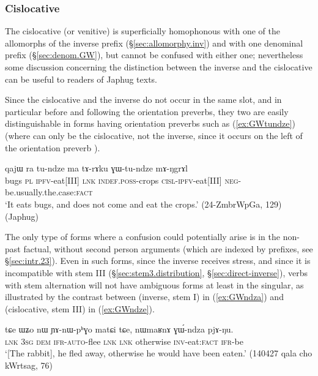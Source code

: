 \subsubsection{Cislocative} \label{sec:cislocative.morpho}
The cislocative (or venitive)  is superficially homophonous with one of the allomorphs of the inverse prefix  (§\ref{sec:allomorphy.inv}) and with one denominal prefix (§\ref{sec:denom.GW}), but cannot be confused with either one; nevertheless some discussion concerning the distinction between the inverse and the cislocative can be useful to readers of Japhug texts.

Since the cislocative and the inverse do not occur in the same slot, and in particular before and following the orientation preverbs, they two are easily distinguishable in forms having orientation preverbs such as (\ref{ex:GWtundze}) (where  can only be the cislocative, not the inverse, since it occurs on the left of the orientation preverb ).

\begin{exe}
\ex \label{ex:GWtundze}
 \gll qajɯ ra tu-ndze ma tɤ-rɤku ɣɯ-tu-ndze mɤ-ŋgrɤl \\
bugs \textsc{pl} \textsc{ipfv}-eat[III] \textsc{lnk} \textsc{indef}.\textsc{poss}-crops   \textsc{cisl}-\textsc{ipfv}-eat[III] \textsc{neg}-be.usually.the.case:\textsc{fact} \\
\glt `It eats bugs, and does not come and eat the crops.' (24-ZmbrWpGa, 129) (Japhug)
\end{exe}

The only type of forms where a confusion could potentially arise is in the non-past factual, without second person arguments (which are indexed by prefixes, see §\ref{sec:intr.23}). Even in such forms, since the inverse receives stress, and since it is incompatible with stem III (§\ref{sec:stem3.distribution}, §\ref{sec:direct-inverse}), verbs with stem alternation will not have ambiguous forms at least in the singular, as illustrated by the contrast between  (inverse, stem I) in (\ref{ex:GWndza}) and  (cislocative, stem III) in (\ref{ex:GWndze}). 

\begin{exe}
\ex \label{ex:GWndza}
 \gll  tɕe ɯʑo nɯ ɲɤ-nɯ-pʰɣo matɕi tɕe, nɯmaʁnɤ ɣɯ́-ndza pjɤ-ŋu. \\
 \textsc{lnk} \textsc{3sg} \textsc{dem} \textsc{ifr}-\textsc{auto}-flee \textsc{lnk} \textsc{lnk} otherwise \textsc{inv}-eat:\textsc{fact} \textsc{ifr}-be \\
\glt `[The rabbit], he fled away, otherwise he would have been eaten.' (140427 qala cho kWrtsag, 76)
\end{exe}

